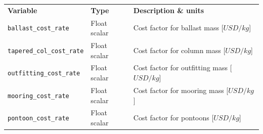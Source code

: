 {\footnotesize
  \begin{tabularx}{\linewidth}{ l l X }
    \textbf{Variable} & \textbf{Type} & \textbf{Description \& units} \\
    \texttt{ballast\_cost\_rate}        & Float scalar   & Cost factor for ballast mass [$USD/kg$]\\
    \texttt{tapered\_col\_cost\_rate}    & Float scalar  & Cost factor for column mass [$USD/kg$]\\
    \texttt{outfitting\_cost\_rate}     & Float scalar  & Cost factor for outfitting mass [$USD/kg$]\\
    \texttt{mooring\_cost\_rate}        & Float scalar     & Cost factor for mooring mass [$USD/kg$]\\
    \texttt{pontoon\_cost\_rate}        & Float scalar   & Cost factor for pontoons [$USD/kg$]\\
  \end{tabularx}
}
